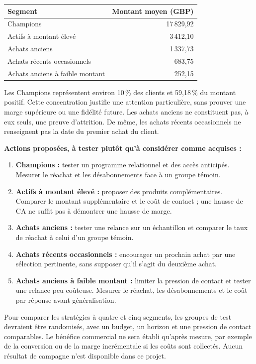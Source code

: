 \documentclass[11pt,a4paper]{article}
\begin{document}
\begin{center}
\small
\renewcommand{\arraystretch}{1.25}
\begin{tabularx}{\textwidth}{@{}Yr@{}}
\toprule
\textbf{Segment} & \textbf{Montant moyen (GBP)} \\
\midrule
Champions & 17\,829,92 \\
Actifs à montant élevé & 3\,412,10 \\
Achats anciens & 1\,337,73 \\
Achats récents occasionnels & 683,75 \\
Achats anciens à faible montant & 252,15 \\
\bottomrule
\end{tabularx}
\end{center}

Les Champions représentent environ 10\,\% des clients et 59,18\,\% du montant
positif. Cette concentration justifie une attention particulière, sans prouver
une marge supérieure ou une fidélité future. Les achats anciens ne constituent
pas, à eux seuls, une preuve d'attrition. De même, les achats récents
occasionnels ne renseignent pas la date du premier achat du client.

\textbf{Actions proposées, à tester plutôt qu'à considérer comme acquises :}
\begin{enumerate}
\item \textbf{Champions :} tester un programme relationnel et des accès anticipés.
Mesurer le réachat et les désabonnements face à un groupe témoin.
\item \textbf{Actifs à montant élevé :} proposer des produits complémentaires.
Comparer le montant supplémentaire et le coût de contact ; une hausse de CA
ne suffit pas à démontrer une hausse de marge.
\item \textbf{Achats anciens :} tester une relance sur un échantillon et comparer
le taux de réachat à celui d'un groupe témoin.
\item \textbf{Achats récents occasionnels :} encourager un prochain achat par
une sélection pertinente, sans supposer qu'il s'agit du deuxième achat.
\item \textbf{Achats anciens à faible montant :} limiter la pression de contact
et tester une relance peu coûteuse. Mesurer le réachat, les désabonnements et
le coût par réponse avant généralisation.
\end{enumerate}

Pour comparer les stratégies à quatre et cinq segments, les groupes de test
devraient être randomisés, avec un budget, un horizon et une pression de
contact comparables. Le bénéfice commercial ne sera établi qu'après mesure,
par exemple de la conversion ou de la marge incrémentale si les coûts sont
collectés. Aucun résultat de campagne n'est disponible dans ce projet.
\end{document}
